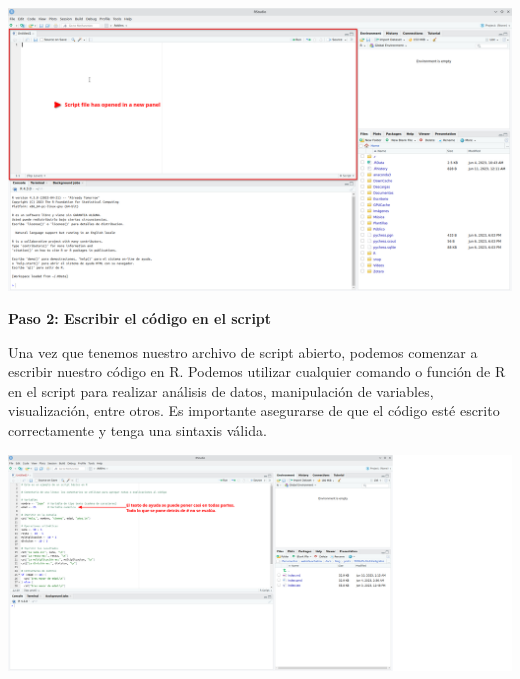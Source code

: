 \documentclass[
  letterpaper,
  DIV=11,
  numbers=noendperiod]{scrartcl}
\begin{document}
\includegraphics{images/Screenshot_20230611_001615.png}

\textbf{Paso 2: Escribir el código en el script}

Una vez que tenemos nuestro archivo de script abierto, podemos comenzar
a escribir nuestro código en R. Podemos utilizar cualquier comando o
función de R en el script para realizar análisis de datos, manipulación
de variables, visualización, entre otros. Es importante asegurarse de
que el código esté escrito correctamente y tenga una sintaxis válida.

\includegraphics{images/Screenshot_20230611_004241.png}
\end{document}
